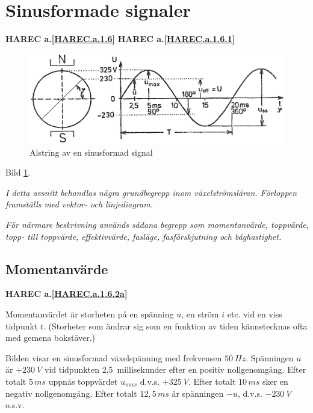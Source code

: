 \section{Sinusformade signaler}
\textbf{HAREC a.\ref{HAREC.a.1.6}\label{myHAREC.a.1.6}}
\textbf{HAREC a.\ref{HAREC.a.1.6.1}\label{myHAREC.a.1.6.1}}

\begin{figure}[h]
\includegraphics[width=\textwidth]{images/cropped_pdfs/bild_2_1-16.pdf}
\caption{Alstring av en sinusformad signal}
\label{fig:BildII1-16}
\end{figure}

Bild \ref{fig:BildII1-16}.

\emph{I detta avsnitt behandlas några grundbegrepp inom växelströmsläran.
Förloppen framställs med vektor- och linjediagram.}

\emph{För närmare beskrivning används sådana begrepp som momentanvärde,
toppvärde, topp- till toppvärde, effektivvärde, fasläge, fasförskjutning och
båghastighet.}

\subsection{Momentanvärde}
\textbf{HAREC a.\ref{HAREC.a.1.6.2a}\label{myHAREC.a.1.6.2a}}

Momentanvärdet är storheten på en spänning \(u\), en ström \(i\) etc. vid en
viss tidpunkt \(t\). (Storheter som ändrar sig som en funktion av tiden
kännetecknas ofta med gemena bokstäver.)

Bilden visar en sinusformad växelspänning med frekvensen \(50\ Hz\). Spänningen
\(u\) är \(+230\ V\) vid tidpunkten 2,5~millisekunder efter en positiv
nollgenomgång. Efter totalt \(5\, ms\) uppnås toppvärdet \(u_{max}\) d.v.s.
\(+325\ V\). Efter totalt \(10\, ms\) sker en negativ nollgenomgång. Efter
totalt \(12,5\, ms\) är spänningen \(-u\), d.v.s. \(-230\ V\) o.s.v.

